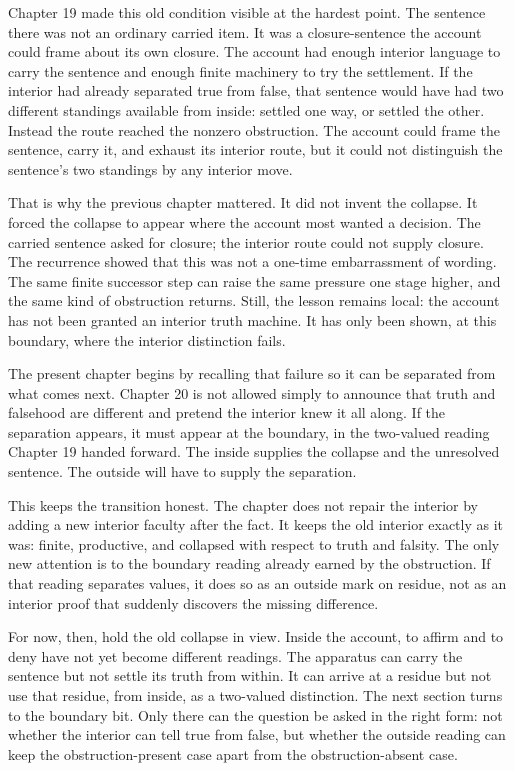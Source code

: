 Chapter 19 made this old condition visible at the hardest point. The sentence there was not an
ordinary carried item. It was a closure-sentence the account could frame about its own closure.
The account had enough interior language to carry the sentence and enough finite machinery to
try the settlement. If the interior had already separated true from false, that sentence would
have had two different standings available from inside: settled one way, or settled the other.
Instead the route reached the nonzero obstruction. The account could frame the sentence, carry
it, and exhaust its interior route, but it could not distinguish the sentence's two standings
by any interior move.

That is why the previous chapter mattered. It did not invent the collapse. It forced the
collapse to appear where the account most wanted a decision. The carried sentence asked for
closure; the interior route could not supply closure. The recurrence showed that this was not
a one-time embarrassment of wording. The same finite successor step can raise the same
pressure one stage higher, and the same kind of obstruction returns. Still, the lesson remains
local: the account has not been granted an interior truth machine. It has only been shown, at
this boundary, where the interior distinction fails.

The present chapter begins by recalling that failure so it can be separated from what comes
next. Chapter 20 is not allowed simply to announce that truth and falsehood are different and
pretend the interior knew it all along. If the separation appears, it must appear at the
boundary, in the two-valued reading Chapter 19 handed forward. The inside supplies the collapse
and the unresolved sentence. The outside will have to supply the separation.

This keeps the transition honest. The chapter does not repair the interior by adding a new
interior faculty after the fact. It keeps the old interior exactly as it was: finite,
productive, and collapsed with respect to truth and falsity. The only new attention is to the
boundary reading already earned by the obstruction. If that reading separates values, it does
so as an outside mark on residue, not as an interior proof that suddenly discovers the missing
difference.

For now, then, hold the old collapse in view. Inside the account, to affirm and to deny have
not yet become different readings. The apparatus can carry the sentence but not settle its
truth from within. It can arrive at a residue but not use that residue, from inside, as a
two-valued distinction. The next section turns to the boundary bit. Only there can the question
be asked in the right form: not whether the interior can tell true from false, but whether the
outside reading can keep the obstruction-present case apart from the obstruction-absent case.

